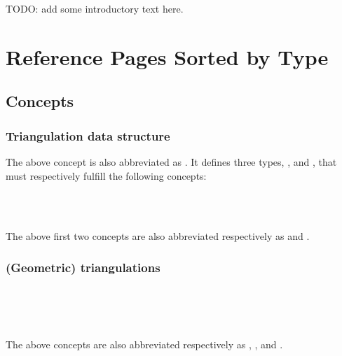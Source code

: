 

TODO: add some introductory text here.

\section{Reference Pages Sorted by Type}

\subsection{Concepts}

\subsubsection*{Triangulation data structure}


The above concept is also abbreviated as . It defines three types,
,  and , that must respectively fulfill the
following concepts:

\\
\\

The above first two concepts are also abbreviated respectively as
 and .

\subsubsection*{(Geometric) triangulations}

\\
\\

\\

The above concepts are also abbreviated respectively as ,
, 
  and .

